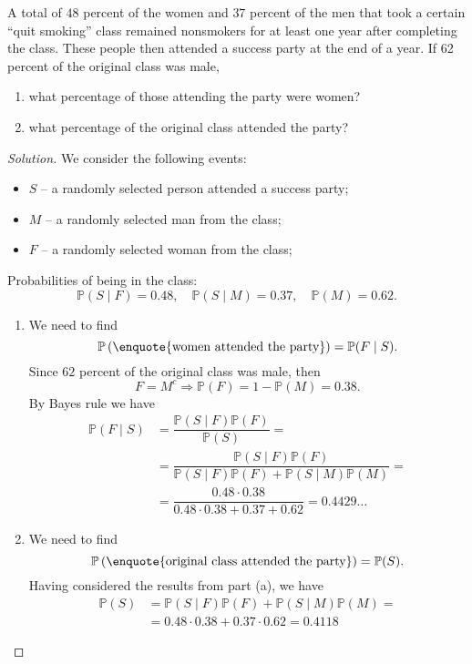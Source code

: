 \documentclass{article}[12pt]
\newenvironment{solution}
  {\renewcommand\qedsymbol{$\blacksquare$}\begin{proof}[Solution]}
  {\end{proof}}
\newenvironment{problem}[1]
  {\renewcommand\theinnercustomprblm{#1}\innercustomprblm}
  {\endinnercustomprblm}
\renewcommand{\P}{\mathbb{P}}
\begin{document}
\begin{problem}{3.19}\normalfont
A total of $48$ percent of the women and $37$ percent of the men that took a certain “quit smoking” class remained nonsmokers for at least one year after completing the class. 
These people then attended a success party at the end of a year. 
If 62 percent of the original class was male,
\begin{enumerate}[label=(\alph*)]
    \item what percentage of those attending the party were women?
    \item what percentage of the original class attended the party?
\end{enumerate}
\end{problem}
\begin{solution}
We consider the following events:
\begin{itemize}
    \item $S$ -- a randomly selected person attended a success party;
    \item $M$ -- a randomly selected man from the class;
    \item $F$ -- a randomly selected woman from the class;
\end{itemize}
Probabilities of being in the class:
\begin{equation*}
    \P(S\mid F) = 0.48,\quad\P(S\mid M) = 0.37,\quad\P(M) = 0.62.
\end{equation*}
\begin{enumerate}[label=(\alph*)]
    \item We need to find
    \begin{equation*}
        \P\left(\text{\enquote{women attended the party}}\right) = \P(F\mid S).
    \end{equation*}
    Since $62$ percent of the original class was male, then
    \begin{equation*}
        F = M^{c} \Longrightarrow\P(F) = 1 - \P(M) = 0.38.
    \end{equation*}
    By Bayes rule we have
    \begin{align*}
        \P(F\mid S) &= \dfrac{\P(S\mid F)\P(F)}{\P(S)} = 
        \\
        & = \dfrac{\P(S\mid F)\P(F)}{\P(S\mid F)\P(F) + \P(S\mid M)\P(M)} =
        \\
        & = \dfrac{0.48\cdot 0.38}{0.48\cdot 0.38 + 0.37 + 0.62} = 0.4429\ldots
    \end{align*}
    
    \item We need to find 
    \begin{equation*}
        \P\left(\text{\enquote{original class attended the party}}\right) = \P(S).
    \end{equation*}
    Having considered the results from part (a), we have
    \begin{align*}
        \P(S) &= \P(S\mid F)\P(F) + \P(S\mid M)\P(M) = 
        \\
        & = 0.48\cdot 0.38 + 0.37\cdot 0.62 = 0.4118
    \end{align*}
\end{enumerate}
\end{solution}
\end{document}
